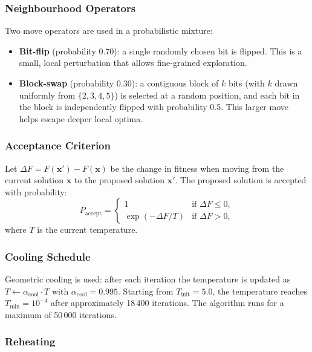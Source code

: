 \documentclass[12pt,a4paper]{article}
\begin{document}
\subsubsection*{Neighbourhood Operators}

Two move operators are used in a probabilistic mixture:
\begin{itemize}
  \item \textbf{Bit-flip} (probability 0.70): a single randomly chosen bit is flipped.
    This is a small, local perturbation that allows fine-grained exploration.
  \item \textbf{Block-swap} (probability 0.30): a contiguous block of $k$ bits (with $k$ drawn uniformly from $\{2, 3, 4, 5\}$) is selected at a random position, and each bit in the block is independently flipped with probability 0.5.
    This larger move helps escape deeper local optima.
\end{itemize}

\subsubsection*{Acceptance Criterion}

Let $\Delta F = F(\mathbf{x}') - F(\mathbf{x})$ be the change in fitness when moving from the current solution $\mathbf{x}$ to the proposed solution $\mathbf{x}'$.
The proposed solution is accepted with probability:
\begin{equation}
  P_{\text{accept}} = \begin{cases} 1 & \text{if } \Delta F \leq 0, \\ \exp(-\Delta F / T) & \text{if } \Delta F > 0, \end{cases}
  \label{eq:metropolis}
\end{equation}
where $T$ is the current temperature.

\subsubsection*{Cooling Schedule}

Geometric cooling is used: after each iteration the temperature is updated as $T \leftarrow \alpha_{\text{cool}} \cdot T$ with $\alpha_{\text{cool}} = 0.995$.
Starting from $T_{\text{init}} = 5.0$, the temperature reaches $T_{\min} = 10^{-4}$ after approximately 18\,400 iterations.
The algorithm runs for a maximum of 50\,000 iterations.

\subsubsection*{Reheating}
\end{document}
